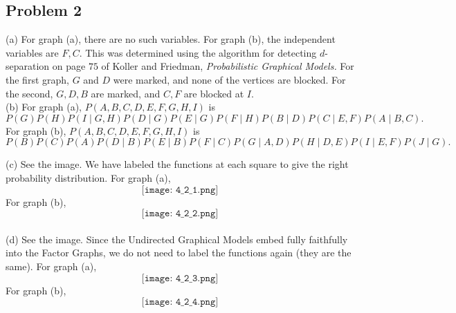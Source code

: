 \documentclass[12pt]{article}
\theoremstyle{remark}
\begin{document}
\subsection*{Problem 2} (a) For graph (a), there are no such variables. For graph (b), the independent variables are $F,C$. This was determined using the algorithm for detecting $d$-separation on page $75$ of Koller and Friedman, \textit{Probabilistic Graphical Models.} For the first graph, $G$ and $D$ were marked, and none of the vertices are blocked. For the second, $G,D,B$ are marked, and $C,F$ are blocked at $I$. \\

\noindent (b) For graph (a), $P(A,B,C,D,E,F,G,H,I)$ is 
\[
P(G) P(H) P(I \mid G,H) P(D \mid G) P(E \mid G) P(F \mid H) P(B \mid D) P(C \mid E,F) P(A \mid B,C).
\]
For graph (b), $P(A,B,C,D,E,F,G,H,I)$ is
\[
P(B) P(C) P(A) P(D \mid B) P(E \mid B) P(F \mid C) P(G \mid A,D) P(H \mid D,E) P(I \mid E,F) P(J \mid G).
\]

\noindent (c) See the image. We have labeled the functions at each square to give the right probability distribution. For graph (a),
\[
\texttt{[image: 4\_2\_1.png]}
\]
For graph (b),
\[
\texttt{[image: 4\_2\_2.png]}
\]
\\

\noindent (d) See the image. Since the Undirected Graphical Models embed fully faithfully into the Factor Graphs, we do not need to label the functions again (they are the same). For graph (a),
\[
\texttt{[image: 4\_2\_3.png]}
\]
For graph (b),
\[
\texttt{[image: 4\_2\_4.png]}
\]
\end{document}
